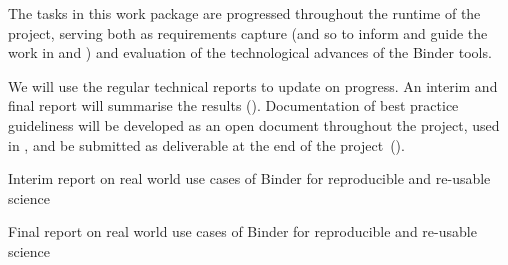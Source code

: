 \begin{workpackage}
\begin{wpdescription}
  \medskip

  The tasks in this work package are progressed throughout the runtime of the
  project, serving both as requirements capture (and so to inform and guide the
  work in  and ) and evaluation of the
  technological advances of the Binder tools.

  We will use the regular technical reports to update on progress. An
  interim  and final
  report will summarise the results ().
  Documentation of best practice guideliness will be developed as an open
  document throughout the project, used in , and be submitted
  as deliverable at the end of the project~().
\end{wpdescription}

\begin{tasklist}


%



\end{tasklist}


\begin{wpdelivs}
  \begin{wpdeliv}[
    id=report-use-cases-interim,
    lead=MP,
    due=18,
    dissem=PU,
    nature=DEC,
    ]
    {
      Interim report on real world use cases of Binder for reproducible and re-usable science
    }
  \end{wpdeliv}

  \begin{wpdeliv}[
    id=report-use-cases,
    lead=MP,
    due=34,
    dissem=PU,
    nature=DEC,
    ]
    {
      Final report on real world use cases of Binder for reproducible and re-usable science
    }
  \end{wpdeliv}



\end{wpdelivs}
\end{workpackage}

